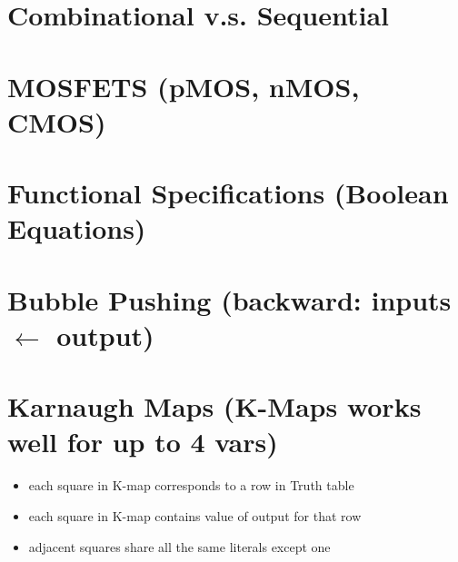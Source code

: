 \documentclass[8pt,a4paper,landscape]{extarticle}
\begin{document}
\pagestyle{empty}
\setlength{\abovedisplayskip}{1pt}
\setlength{\belowdisplayskip}{1pt}
\setlength{\abovedisplayshortskip}{0pt}
\setlength{\belowdisplayshortskip}{0pt}

\begin{multicols*}{3}

% 


\section*{Combinational v.s. Sequential}
% 

\section*{MOSFETS (pMOS, nMOS, CMOS)}
% 

\section*{Functional Specifications (Boolean Equations)}
% 

\section*{Bubble Pushing (backward: inputs $\leftarrow$ output)}
% 

\section*{Karnaugh Maps (K-Maps works well for up to 4 vars)}
\begin{itemize}
\item each square in K-map corresponds to a row in Truth table
\item each square in K-map contains value of output for that row
\item adjacent squares share all the same literals except one
\end{itemize}
\end{multicols*}
\end{document}
